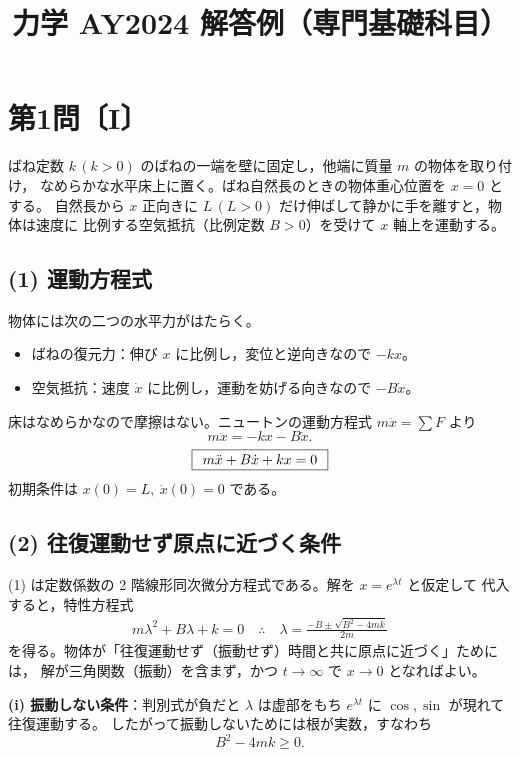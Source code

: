 \documentclass[11pt,a4paper]{article}
\title{力学 AY2024 解答例（専門基礎科目）}
\author{}
\date{}
\begin{document}
\maketitle

\section*{第1問〔I〕}

ばね定数 $k\,(k>0)$ のばねの一端を壁に固定し，他端に質量 $m$ の物体を取り付け，
なめらかな水平床上に置く。ばね自然長のときの物体重心位置を $x=0$ とする。
自然長から $x$ 正向きに $L\,(L>0)$ だけ伸ばして静かに手を離すと，物体は速度に
比例する空気抵抗（比例定数 $B>0$）を受けて $x$ 軸上を運動する。

\subsection*{(1) 運動方程式}
物体には次の二つの水平力がはたらく。
\begin{itemize}
  \item ばねの復元力：伸び $x$ に比例し，変位と逆向きなので $-kx$。
  \item 空気抵抗：速度 $\dot{x}$ に比例し，運動を妨げる向きなので $-B\dot{x}$。
\end{itemize}
床はなめらかなので摩擦はない。ニュートンの運動方程式 $m\ddot{x}=\sum F$ より
\[
  m\ddot{x} = -kx - B\dot{x}.
\]
\[
  \boxed{\,\; m\ddot{x} + B\dot{x} + kx = 0 \;\,}
\]
初期条件は $x(0)=L,\ \dot{x}(0)=0$ である。

\subsection*{(2) 往復運動せず原点に近づく条件}
(1) は定数係数の 2 階線形同次微分方程式である。解を $x=e^{\lambda t}$ と仮定して
代入すると，特性方程式
\begin{align*}
  m\lambda^2 + B\lambda + k = 0
  \quad\therefore\quad
  \lambda = \frac{-B \pm \sqrt{B^2 - 4mk}}{2m}
\end{align*}
を得る。物体が「往復運動せず（振動せず）時間と共に原点に近づく」ためには，
解が三角関数（振動）を含まず，かつ $t\to\infty$ で $x\to0$ となればよい。

\medskip
\noindent\textbf{(i) 振動しない条件}：判別式が負だと
$\lambda$ は虚部をもち $e^{\lambda t}$ に $\cos,\sin$ が現れて往復運動する。
したがって振動しないためには根が実数，すなわち
\[
  B^2 - 4mk \ge 0.
\]
\end{document}
